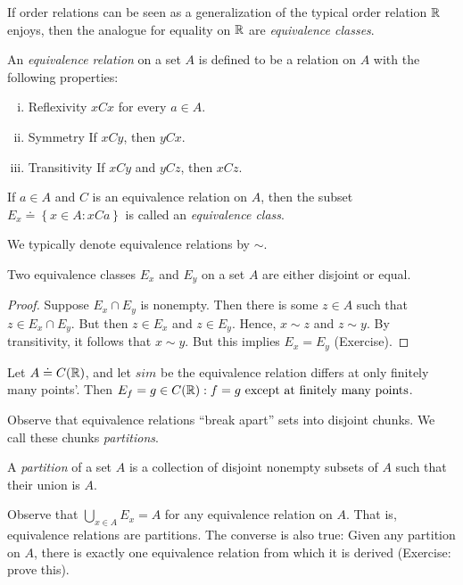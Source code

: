 If order relations can be seen as a generalization of the typical order relation
$\mathbb{R}$ enjoys, then the analogue for equality on $\mathbb{R}$ are \emph{equivalence
classes}.
\begin{definition}
	An \emph{equivalence relation} on a set $A$ is defined to be a relation on $A$
	with the following properties:
	\begin{enumerate}[(i)]
		\item{Reflexivity} $xCx$ for every $a \in A$.
		\item{Symmetry} If $xCy$, then $yCx$.
		\item{Transitivity} If $xCy$ and $yCz$, then $xCz$.
	\end{enumerate}
	If $a \in A$ and $C$ is an equivalence relation on $A$, then 
	the subset $E_{x} \doteq \left\{ x \in A: xCa  \right\}$ is called
	an \emph{equivalence class}.

	We typically denote equivalence relations by $\sim$.
\end{definition}
\begin{lemma}\label{lem:}
	Two equivalence classes $E_{x}$ and $E_{y}$ on a set $A$ are 
	either disjoint or equal.
\end{lemma}
\begin{proof}
	Suppose $E_{x} \cap E_{y}$ is nonempty. Then there is some $z \in A$
	such that $z \in E_{x} \cap E_{y}$. But then $z \in E_{x}$ and
	$z \in E_{y}$. Hence, $x \sim z$ and $z \sim y$. By transitivity, it follows
	that $x \sim y$. But this implies $E_{x} = E_{y}$ (Exercise).		
\end{proof}
\begin{example}
	Let $A \doteq C(\mathbb{R})$, and let $sim$ be the equivalence relation differs at
	only finitely many points'. Then $E_{f} = {g \in C(\mathbb{R}): f=g \ \text{except at
	finitely many points}}$.
\end{example}
Observe that equivalence relations ``break apart'' sets into disjoint chunks. We call
these chunks \emph{partitions}.
\begin{definition}
	A \emph{partition} of a set $A$  is a collection of disjoint nonempty subsets of
	$A$ such that their union is $A$.
\end{definition}
Observe that $\bigcup_{x \in A}  E_{x}  = A$ for any equivalence relation on
$A$. That is, equivalence relations are partitions. The converse is also true:
Given any partition on $A$, there is exactly one equivalence relation from
which it is derived (Exercise: prove this).

